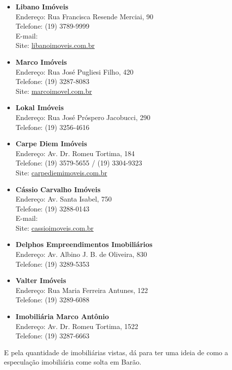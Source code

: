 \begin{itemize}
    \item   \textbf{Libano Imóveis}
        \\Endereço: Rua Francisca Resende Merciai, 90
        \\Telefone: (19) 3789-9999
        \\E-mail: 
        \\Site: \url{libanoimoveis.com.br}

    \item   \textbf{Marco Imóveis}
        \\Endereço: Rua José Pugliesi Filho, 420
        \\Telefone: (19) 3287-8083
        \\Site: \url{marcoimovel.com.br}

    \item   \textbf{Lokal Imóveis}
        \\Endereço: Rua José Próspero Jacobucci, 290
        \\Telefone: (19) 3256-4616

    \item   \textbf{Carpe Diem Imóveis}
        \\Endereço: Av. Dr. Romeu Tortima, 184
        \\Telefone: (19) 3579-5655 / (19) 3304-9323
        \\Site: \url{carpediemimoveis.com.br}

    \item   \textbf{Cássio Carvalho Imóveis}
        \\Endereço: Av. Santa Isabel, 750
        \\Telefone: (19) 3288-0143
        \\E-mail: 
        \\Site: \url{cassioimoveis.com.br}

    \item   \textbf{Delphos Empreendimentos Imobiliários}
        \\Endereço: Av. Albino J. B. de Oliveira, 830
        \\Telefone: (19) 3289-5353

    \item   \textbf{Valter Imóveis}
        \\Endereço: Rua Maria Ferreira Antunes, 122
        \\Telefone: (19) 3289-6088

    \item   \textbf{Imobiliária Marco Antônio}
        \\Endereço: Av. Dr. Romeu Tortima, 1522
        \\Telefone: (19) 3287-6663

\end{itemize}

E pela quantidade de imobiliárias vistas, dá para ter uma ideia de como a 
especulação imobiliária come solta em Barão.
